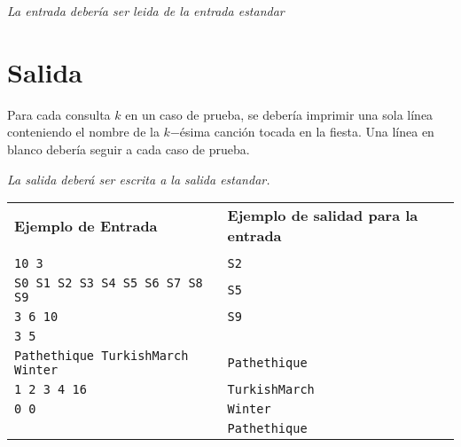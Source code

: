 \documentclass[a4paper,12pt]{article}
\begin{document}
\emph{La entrada debería ser leida de la entrada estandar} 

\section*{Salida}
 Para cada consulta $k$ en un caso de prueba, se debería
imprimir una sola línea conteniendo el nombre de la $k$−ésima
canción tocada en la fiesta. Una línea en blanco debería seguir a cada caso de prueba.

\emph{La salida deberá ser escrita a la salida estandar.}\\

\begin{tabular}{|l|l|}
  \hline
  \textbf{Ejemplo de Entrada}&\textbf{Ejemplo de salidad para la entrada}\\
   &\\
 \verb|10 3| &\verb|S2|\\
 \verb|S0 S1 S2 S3 S4 S5 S6 S7 S8 S9| & \verb|S5|\\
 \verb|3 6 10| & \verb|S9|\\
 \verb|3 5|& \\
 \verb|Pathethique TurkishMarch Winter|& \verb|Pathethique|\\
 \verb|1 2 3 4 16|& \verb|TurkishMarch|\\
 \verb|0 0|& \verb|Winter|\\
 & \verb|Pathethique|\\
  \hline
\end{tabular}
\end{document}
